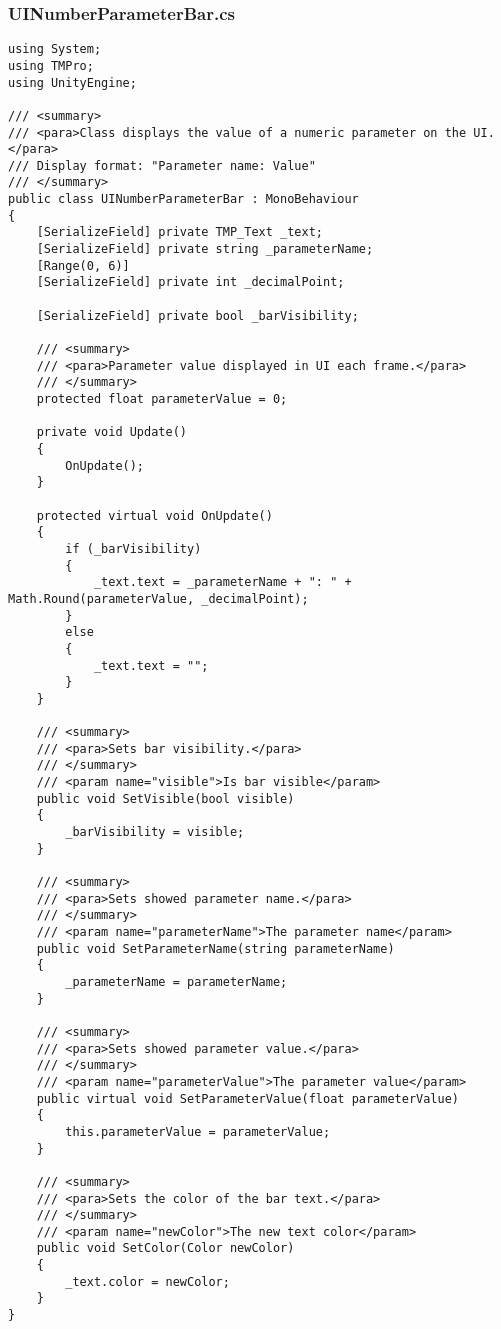 \subsubsection*{UINumberParameterBar.cs}
\begin{verbatim}
using System;
using TMPro;
using UnityEngine;

/// <summary>
/// <para>Class displays the value of a numeric parameter on the UI.</para>
/// Display format: "Parameter name: Value"
/// </summary>
public class UINumberParameterBar : MonoBehaviour
{
    [SerializeField] private TMP_Text _text;
    [SerializeField] private string _parameterName;
    [Range(0, 6)]
    [SerializeField] private int _decimalPoint;

    [SerializeField] private bool _barVisibility;

    /// <summary>
    /// <para>Parameter value displayed in UI each frame.</para>
    /// </summary>
    protected float parameterValue = 0;

    private void Update()
    {
        OnUpdate();
    }

    protected virtual void OnUpdate()
    {
        if (_barVisibility)
        {
            _text.text = _parameterName + ": " + Math.Round(parameterValue, _decimalPoint);
        }
        else
        {
            _text.text = "";
        }
    }

    /// <summary>
    /// <para>Sets bar visibility.</para>
    /// </summary>
    /// <param name="visible">Is bar visible</param>
    public void SetVisible(bool visible)
    {
        _barVisibility = visible;
    }

    /// <summary>
    /// <para>Sets showed parameter name.</para>
    /// </summary>
    /// <param name="parameterName">The parameter name</param>
    public void SetParameterName(string parameterName)
    {
        _parameterName = parameterName;
    }

    /// <summary>
    /// <para>Sets showed parameter value.</para>
    /// </summary>
    /// <param name="parameterValue">The parameter value</param>
    public virtual void SetParameterValue(float parameterValue)
    {
        this.parameterValue = parameterValue;
    }

    /// <summary>
    /// <para>Sets the color of the bar text.</para>
    /// </summary>
    /// <param name="newColor">The new text color</param>
    public void SetColor(Color newColor)
    {
        _text.color = newColor;
    }
}
\end{verbatim}
